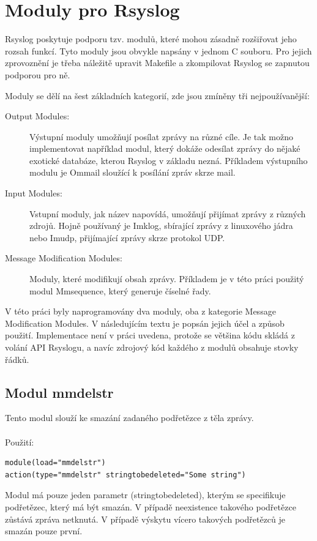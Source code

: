 \documentclass[thesis=B,czech]{FITthesis}[2012/06/26]
\begin{document}
\section{Moduly pro Rsyslog}
Rsyslog poskytuje podporu tzv. modulů, které mohou zásadně rozšiřovat jeho rozsah funkcí. Tyto moduly jsou obvykle napsány v jednom C souboru. Pro jejich zprovoznění je třeba náležitě upravit Makefile a zkompilovat Rsyslog se zapnutou podporou pro ně.

Moduly se dělí na šest základních kategorií, zde jsou zmíněny tři nejpoužívanější:

\begin{description}
  \item [Output Modules:] Výstupní moduly umožňují posílat zprávy na různé cíle. Je tak možno implementovat například modul, který dokáže odesílat zprávy do nějaké exotické databáze, kterou Rsyslog v základu nezná. Příkladem výstupního modulu je Ommail sloužící k posílání zpráv skrze mail.
  \item [Input Modules:] Vstupní moduly, jak název napovídá, umožňují přijímat zprávy z různých zdrojů. Hojně používaný je Imklog, sbírající zprávy z linuxového jádra nebo Imudp, přijímající zprávy skrze protokol UDP.
  \item [Message Modification Modules:] Moduly, které modifikují obsah zprávy. Příkladem je v této práci použitý modul Mmsequence, který generuje číselné řady.
\end{description}

V této práci byly naprogramovány dva moduly, oba z kategorie Message Modification Modules. V následujícím textu je popsán jejich účel a způsob použití. Implementace není v práci uvedena, protože se většina kódu skládá z volání API Rsyslogu, a navíc zdrojový kód každého z modulů obsahuje stovky řádků.

\subsection{Modul mmdelstr}
Tento modul slouží ke smazání zadaného podřetězce z těla zprávy.
\\
\\
Použití:
\begin{lstlisting}[style=RainerScriptSimpleStyle]
module(load="mmdelstr") 
action(type="mmdelstr" stringtobedeleted="Some string")
\end{lstlisting}

Modul má pouze jeden parametr (stringtobedeleted), kterým se specifikuje podřetězec, který má být smazán. V případě neexistence takového podřetězce zůstává zpráva netknutá. V případě výskytu vícero takových podřetězců je smazán pouze první.
\end{document}
